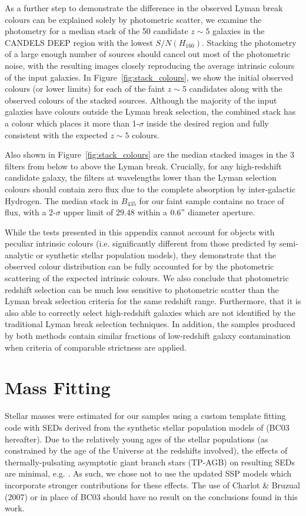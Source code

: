 As a further step to demonstrate the difference in the observed Lyman break colours can be explained solely by photometric scatter, we examine the photometry for a median stack of the 50 candidate $z \sim 5$ galaxies in the CANDELS DEEP region with the lowest $S/N(H_{160})$. Stacking the photometry of a large enough number of sources should cancel out most of the photometric noise, with the resulting images closely reproducing the average intrinsic colours of the input galaxies. In Figure~\ref{fig:stack_colours}, we show the initial observed colours (or lower limits) for each of the faint $z\sim5$ candidates along with the observed colours of the stacked sources. Although the majority of the input galaxies have colours outside the Lyman break selection, the combined stack has a colour which places it more than 1-$\sigma$ inside the desired region and fully consistent with the expected $z \sim 5$ colours.

Also shown in Figure~\ref{fig:stack_colours} are the median stacked images in the 3 filters from below to above the Lyman break. Crucially, for any high-redshift candidate galaxy, the filters at wavelengths lower than the Lyman selection colours should contain zero flux due to the complete absorption by inter-galactic Hydrogen. The median stack in $B_{435}$ for our faint sample contains no trace of flux, with a 2-$\sigma$ upper limit of $29.48$ within a $0.6"$ diameter aperture.

While the tests presented in this appendix cannot account for objects with peculiar intrinsic colours (i.e. significantly different from those predicted by semi-analytic or synthetic stellar population models), they demonstrate that the observed colour distribution can be fully accounted for by the photometric scattering of the expected intrinsic colours. We also conclude that photometric redshift selection can be much less sensitive to photometric scatter than the Lyman break selection criteria for the same redshift range. Furthermore, that it is also able to correctly select high-redshift galaxies which are not identified by the traditional Lyman break selection techniques. In addition, the samples produced by both methods contain similar fractions of low-redshift galaxy contamination when criteria of comparable strictness are applied.


\section{Mass Fitting}\label{sec:masses}
Stellar masses were estimated for our samples using a custom template fitting code with SEDs derived from the synthetic stellar population models of \citet{Bruzual:2003ckb} (BC03 hereafter). Due to the relatively young ages of the stellar populations (as constrained by the age of the Universe at the redshifts involved), the effects of thermally-pulsating asymptotic giant branch stars (TP-AGB) on resulting SEDs are minimal, e.g. \citet{2009ApJ...697.1493S}. As such, we chose not to use the updated SSP models which incorporate stronger contributions for these effects. The use of Charlot \& Bruzual (2007) or \citet{Maraston:2005er} in place of BC03 should have no result on the conclusions found in this work.

